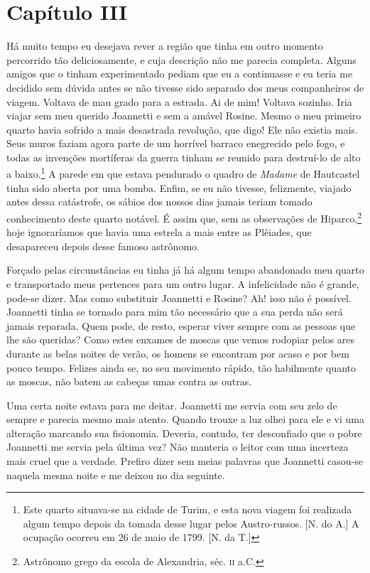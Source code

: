 \section{Capítulo III}

 Há muito tempo eu desejava rever a região que tinha em outro momento
percorrido tão deliciosamente, e cuja descrição não me parecia
completa. Alguns amigos que o tinham experimentado pediam que eu a
continuasse e eu teria me decidido sem dúvida antes se não tivesse sido
separado dos meus companheiros de viagem. Voltava de mau grado para a
estrada. Ai de mim! Voltava sozinho. Iria viajar sem meu querido
Joannetti e sem a amável Rosine. Mesmo o meu primeiro quarto havia
sofrido a mais desastrada revolução, que digo! Ele não existia mais.
Seus muros faziam agora parte de um horrível barraco enegrecido pelo
fogo, e todas as invenções mortíferas da guerra tinham se reunido para
destruí-lo de alto a baixo.\footnote{ Este quarto situava-se na cidade
de Turim, e esta nova viagem foi realizada algum tempo depois da tomada
desse lugar pelos Austro-russos. [N. do A.]  A ocupação ocorreu em 26 de maio
de 1799. [N. da T.]} A parede em que estava pendurado o quadro de \textit{Madame} de
Hautcastel tinha sido aberta por uma bomba. Enfim, se eu não tivesse,
felizmente, viajado antes dessa catástrofe, os sábios dos nossos dias
jamais teriam tomado conhecimento deste quarto notável. É assim que,
sem as observações de Hiparco,\footnote{ Astrônomo grego da escola de
Alexandria, séc. \textsc{ii} a.C.} hoje ignoraríamos que havia uma estrela a
mais entre as Plêiades, que desapareceu depois desse famoso astrônomo. 

 Forçado pelas circunstâncias eu tinha já há algum tempo abandonado meu
quarto e transportado meus pertences para um outro lugar. A
infelicidade não é grande, pode-se dizer. Mas como substituir Joannetti
e Rosine? Ah! isso não é possível. Joannetti tinha se tornado para mim tão
necessário que a sua perda não será jamais reparada. Quem
pode, de resto, esperar viver sempre com as pessoas que lhe são
queridas? Como estes enxames de moscas que vemos rodopiar pelos ares
durante as belas noites de verão, os homens se encontram por acaso e
por bem pouco tempo. Felizes ainda se, no seu movimento rápido, tão
habilmente quanto as moscas, não batem as cabeças umas contra as outras.


 Uma certa noite estava para me deitar. Joannetti me servia com seu zelo
de sempre e parecia mesmo mais atento. Quando trouxe a luz olhei para
ele e vi uma alteração marcando sua fisionomia. Deveria, contudo, ter
desconfiado que o pobre Joannetti me servia pela última vez? Não
manteria o leitor com uma incerteza mais cruel que a verdade. Prefiro
dizer sem meias palavras que Joannetti casou-se naquela mesma noite e
me deixou no dia seguinte.


